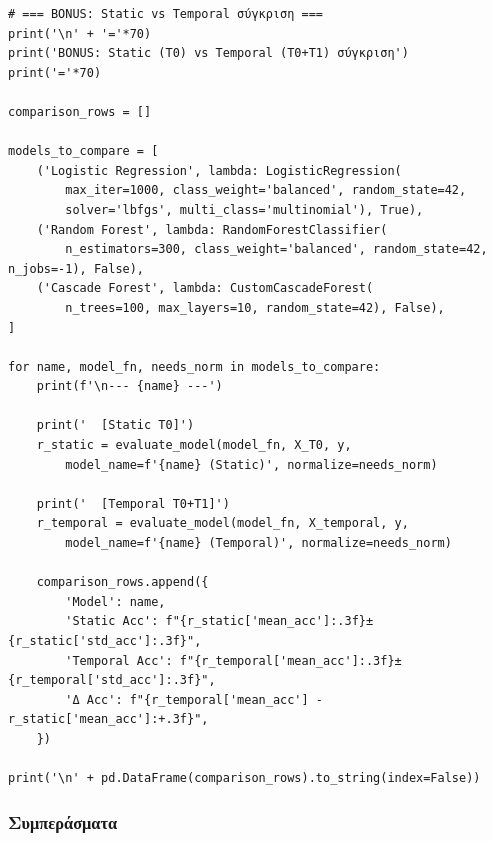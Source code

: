 \begin{lstlisting}
# === BONUS: Static vs Temporal σύγκριση ===
print('\n' + '='*70)
print('BONUS: Static (T0) vs Temporal (T0+T1) σύγκριση')
print('='*70)
 
comparison_rows = []
 
models_to_compare = [
    ('Logistic Regression', lambda: LogisticRegression(
        max_iter=1000, class_weight='balanced', random_state=42,
        solver='lbfgs', multi_class='multinomial'), True),
    ('Random Forest', lambda: RandomForestClassifier(
        n_estimators=300, class_weight='balanced', random_state=42, n_jobs=-1), False),
    ('Cascade Forest', lambda: CustomCascadeForest(
        n_trees=100, max_layers=10, random_state=42), False),
]
 
for name, model_fn, needs_norm in models_to_compare:
    print(f'\n--- {name} ---')
 
    print('  [Static T0]')
    r_static = evaluate_model(model_fn, X_T0, y,
        model_name=f'{name} (Static)', normalize=needs_norm)
 
    print('  [Temporal T0+T1]')
    r_temporal = evaluate_model(model_fn, X_temporal, y,
        model_name=f'{name} (Temporal)', normalize=needs_norm)
 
    comparison_rows.append({
        'Model': name,
        'Static Acc': f"{r_static['mean_acc']:.3f}±{r_static['std_acc']:.3f}",
        'Temporal Acc': f"{r_temporal['mean_acc']:.3f}±{r_temporal['std_acc']:.3f}",
        'Δ Acc': f"{r_temporal['mean_acc'] - r_static['mean_acc']:+.3f}",
    })
 
print('\n' + pd.DataFrame(comparison_rows).to_string(index=False))
\end{lstlisting}
 
\subsubsection*{Συμπεράσματα}
 
